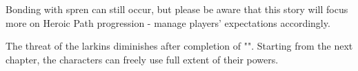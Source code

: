 Bonding with spren can still occur, but please be aware that this story will focus more on Heroic Path progression - manage players’ expectations accordingly.

The threat of the larkins diminishes after completion of "". Starting from the next chapter, the characters can freely use full extent of their powers.